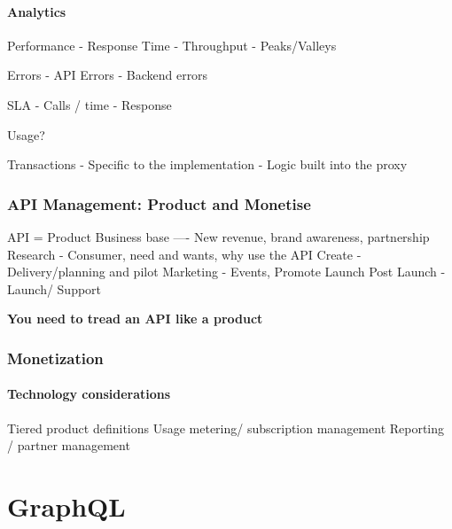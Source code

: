 \paragraph{Analytics}
Performance
- Response Time
- Throughput
- Peaks/Valleys

Errors
- API Errors
- Backend errors

SLA
- Calls / time
- Response

Usage?

Transactions
- Specific to the implementation
- Logic built into the proxy

\subsubsection{API Management: Product and Monetise}
API = Product
Business base ---- New revenue, brand awareness, partnership
Research - Consumer, need and wants, why use the API
Create - Delivery/planning and pilot
Marketing - Events, Promote
Launch Post Launch - Launch/ Support

\textbf{You need to tread an API like a product}

\subsubsection{Monetization}

\paragraph{Technology considerations}
Tiered product definitions
Usage metering/ subscription management
Reporting / partner management


\section{GraphQL}

%

